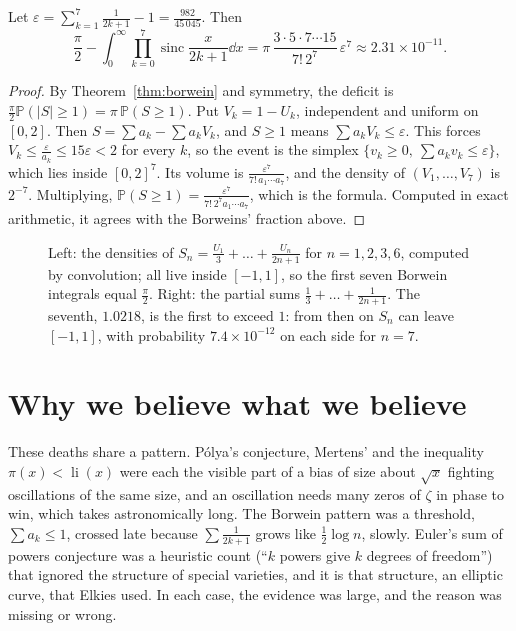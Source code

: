 \begin{corollary}\label{cor:borweindeficit}
Let $\varepsilon=\sum_{k=1}^7\frac1{2k+1}-1=\frac{982}{45\,045}$. Then
\[
\frac\pi2-\int_0^\infty\prod_{k=0}^7\operatorname{sinc}\frac x{2k+1}\dd x=\pi\,\frac{3\cdot5\cdot7\cdots15}{7!\,2^7}\,\varepsilon^7\approx2.31\times10^{-11}.
\]
\end{corollary}
\begin{proof}
By Theorem~\ref{thm:borwein} and symmetry, the deficit is $\frac\pi2\mathbb P(|S|\ge1)=\pi\,\mathbb P(S\ge1)$. Put $V_k=1-U_k$, independent and uniform on $[0,2]$. Then
$S=\sum a_k-\sum a_kV_k$, and $S\ge1$ means $\sum a_kV_k\le\varepsilon$. This forces $V_k\le\frac\varepsilon{a_k}\le15\varepsilon<2$ for every $k$, so the event is
the simplex $\{v_k\ge0,\ \sum a_kv_k\le\varepsilon\}$, which lies inside $[0,2]^7$. Its volume is $\frac{\varepsilon^7}{7!\,a_1\cdots a_7}$, and the density of
$(V_1,\dots,V_7)$ is $2^{-7}$. Multiplying, $\mathbb P(S\ge1)=\frac{\varepsilon^7}{7!\,2^7a_1\cdots a_7}$, which is the formula. Computed in exact arithmetic, it
agrees with the Borweins' fraction above.
\end{proof}

\begin{figure}[ht]
\centering
{}
\caption{Left: the densities of $S_n=\frac{U_1}3+\dots+\frac{U_n}{2n+1}$ for $n=1,2,3,6$, computed by convolution; all live inside $[-1,1]$, so the first seven
Borwein integrals equal $\frac\pi2$. Right: the partial sums $\frac13+\dots+\frac1{2n+1}$. The seventh, $1.0218$, is the first to exceed $1$: from then on $S_n$
can leave $[-1,1]$, with probability $7.4\times10^{-12}$ on each side for $n=7$.}
\label{fig:borwein}
\end{figure}

\section{Why we believe what we believe}

These deaths share a pattern. P\'olya's conjecture, Mertens' and the inequality $\pi(x)<\operatorname{li}(x)$ were each the visible part of a bias of size about
$\sqrt x$ fighting oscillations of the same size, and an oscillation needs many zeros of $\zeta$ in phase to win, which takes astronomically long. The Borwein
pattern was a threshold, $\sum a_k\le1$, crossed late because $\sum\frac1{2k+1}$ grows like $\frac12\log n$, slowly. Euler's sum of powers conjecture was a
heuristic count (``$k$ powers give $k$ degrees of freedom'') that ignored the structure of special varieties, and it is that structure, an elliptic curve, that
Elkies used. In each case, the evidence was large, and the reason was missing or wrong.

